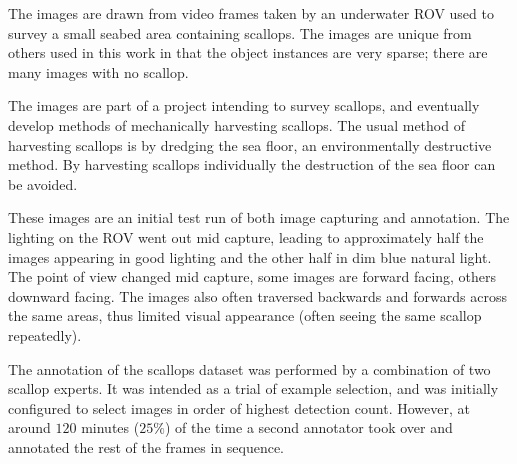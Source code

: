 \begin{itemize}
The images are drawn from video frames taken by an underwater \gls{ROV} used to survey a small seabed area containing scallops. The images are unique from others used in this work in that the object instances are very sparse; there are many images with no scallop. 

The images are part of a project intending to survey scallops, and eventually develop methods of mechanically harvesting scallops. The usual method of harvesting scallops is by dredging the sea floor, an environmentally destructive method. By harvesting scallops individually the destruction of the sea floor can be avoided.

These images are an initial test run of both image capturing and annotation. The lighting on the \gls{ROV} went out mid capture, leading to approximately half the images appearing in good lighting and the other half in dim blue natural light. The point of view changed mid capture, some images are forward facing, others downward facing. The images also often traversed backwards and forwards across the same areas, thus limited visual appearance (often seeing the same scallop repeatedly). 

The annotation of the scallops dataset was performed by a combination of two scallop experts. It was intended as a trial of example selection, and was initially configured to select images in order of highest detection count. However, at around $120$ minutes ($25\%$) of the time a second annotator took over and annotated the rest of the frames in sequence.

\end{itemize}


